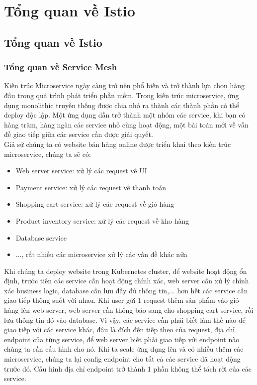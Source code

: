 \documentclass[12pt,a4paper]{report}
\begin{document}
\chapter{Tổng quan về Istio}
	\section{Tổng quan về Istio}
		\subsection{Tổng quan về Service Mesh}
			\hspace{0.6cm}Kiến trúc Microservice ngày càng trở nên phổ biến và trở thành lựa chọn hàng đầu trong quá trình phát triển phần mềm. Trong kiến trúc microservice, ứng dụng monolithic truyền thống được chia nhỏ ra thành các thành phần có thể deploy độc lập. Một ứng dụng dần trở thành một nhóm các service, khi bạn có hàng trăm, hàng ngàn các service nhỏ cùng hoạt động, một bài toán mới về vấn đề giao tiếp giữa các service cần được giải quyết.\\
			
			Giả sử chúng ta có website bán hàng online được triển khai theo kiến trúc microservice, chúng ta sẽ có:
			\begin{itemize}
				\item Web server service: xử lý các request về UI
				\item Payment service: xử lý các request về thanh toán
				\item Shopping cart service: xử lý các request về giỏ hàng
				\item Product inventory service: xử lý các request về kho hàng
				\item Database service
				\item ..., rất nhiều các microservice xử lý các vấn đề khác nữa
			\end{itemize}
		
		Khi chúng ta deploy website trong Kubernetes cluster, để website hoạt động ổn định, trước tiên các service cần hoạt động chính xác, web server cần xử lý chính xác business logic, database cần lưu đầy đủ thông tin,... hơn hết các service cần giao tiếp thông suốt với nhau. Khi user gửi 1 request thêm sản phẩm vào giỏ hàng lên web server, web server cần thông báo sang cho shopping cart service, rồi lưu thông tin đó vào database. Vì vậy, các service cần phải biết làm thế nào để giao tiếp với các service khác, đâu là đích đến tiếp theo của request, địa chỉ endpoint của từng service, để web server biết phải giao tiếp với endpoint nào chúng ta cần cấu hình cho nó. Khi ta scale ứng dụng lên và có nhiều thêm các microservice, chúng ta lại config endpoint cho tất cả các service đã hoạt động trước đó. Cấu hình địa chỉ endpoint trở thành 1 phần không thể tách rời của các service.
		
\end{document}

